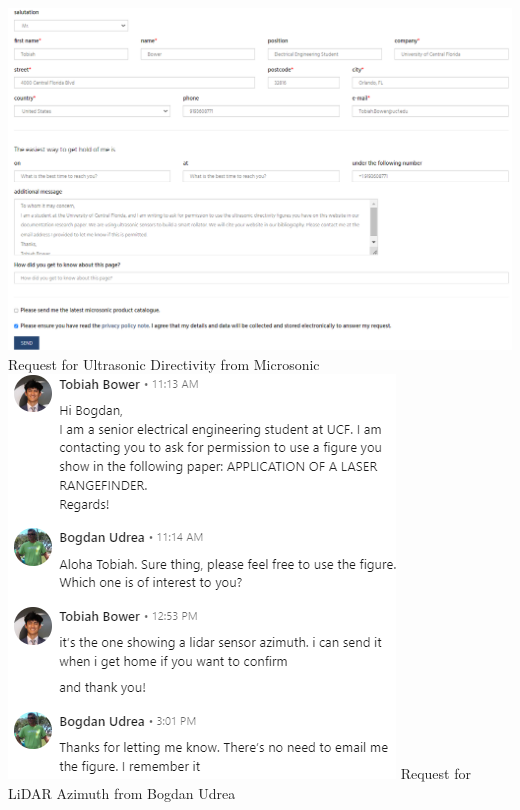 
\begin{center}
\includegraphics[width=\textwidth]{./Images/permit1.png}
\newline Request for Ultrasonic Directivity from Microsonic\\

\includegraphics[width=\textwidth]{./Images/permit2.png}
\newline Request for LiDAR Azimuth from Bogdan Udrea\\



\end{center}
